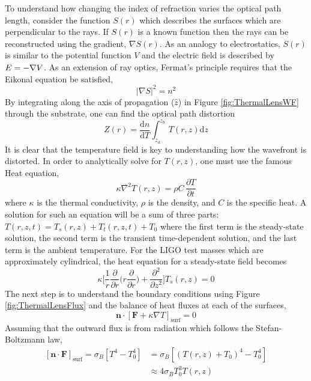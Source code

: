 	To understand how changing the index of refraction varies the optical path length, consider the function $S(r)$ which describes the surfaces which are perpendicular to the rays. If $S(r)$ is a known function then the rays can be reconstructed using the gradient, $\nabla S(r)$.  As an analogy to electrostatics, $S(r)$ is similar to the potential function $V$ and the electric field is described by $\boldmath{E}=-\nabla V$.  As an extension of ray optics, Fermat's principle requires that the Eikonal equation be satisfied,
	\begin{equation}
	\vert \nabla S \vert^2 = n^2
	\end{equation}
	By integrating along the axis of propagation ($\hat{z}$) in Figure \ref{fig:ThermalLensWF} through the substrate, one can find the optical path distortion
	\begin{equation}\label{eq:thermoref}
	Z(r) =  \frac{\text{d}n}{\text{d}T} \int_{z_a}^{z_b} \, T(r,z) \text{d}z
	\end{equation}
	It is clear that the temperature field is key to understanding how the wavefront is distorted. In order to analytically solve for $T(r,z)$, one must use the famous Heat equation,
	\begin{equation}\label{eq:heat_eq}
		\kappa \nabla^2 T(r,z) = \rho C\, \frac{\partial T}{\partial t} 
	\end{equation}
	where $\kappa$ is the thermal conductivity, $\rho$ is the density, and $C$ is the specific heat.  A solution for such an equation will be a sum of three parts: $T(r,z,t) = T_{s}(r,z) + T_{t}(r,z,t) + T_0$ where the first term is the steady-state solution, the second term is the transient time-dependent solution, and the last term is the ambient temperature.  For the LIGO test masses which are approximately cylindrical, the heat equation for a steady-state field becomes
	\begin{equation}
		\kappa \bigg[ \frac{1}{r} \frac{\partial}{\partial r} \bigg( r \frac{\partial}{\partial r}\bigg) +  \frac{\partial^2}{\partial z^2} \bigg] T_{s}(r,z) = 0
	\end{equation}
	The next step is to understand the boundary conditions using Figure \ref{fig:ThermalLensFlux} and the balance of heat fluxes at each of the surfaces,
	\begin{equation}
	\textbf{n} \cdot [ \textbf{F} + \kappa \nabla T]_{\text{surf}} = 0 
	\end{equation}
	Assuming that the outward flux is from radiation which follows the Stefan-Boltzmann law,
	\begin{equation}\label{eq:heat_flux}
	\begin{aligned}
	[\textbf{n} \cdot  \textbf{F}]_{\text{surf}} = \sigma_B  [T^4 - T_0^4] 	&= \sigma_B [(T(r,z) + T_0)^4 - T_0^4] \\
																			&\approx 4 \sigma_B T_0^3 T(r,z)
	\end{aligned}
	\end{equation}
